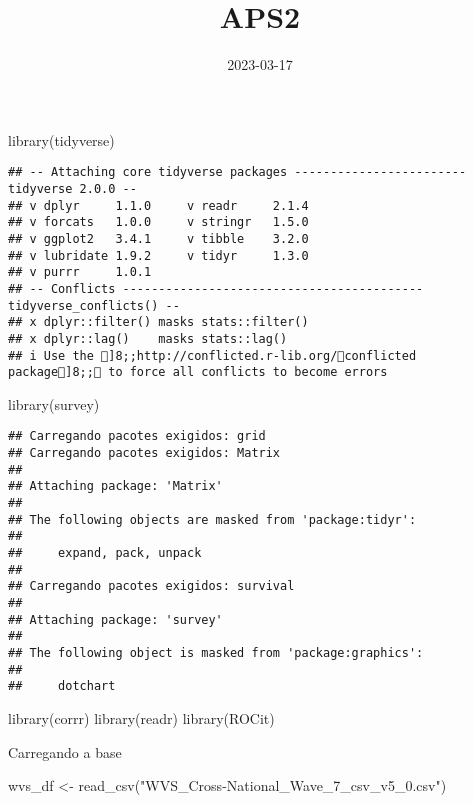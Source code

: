 \documentclass[
]{article}
\title{APS2}
\author{}
\date{\vspace{-2.5em}2023-03-17}
\newenvironment{Shaded}{\begin{snugshade}}{\end{snugshade}}
\newcommand{\FunctionTok}[1]{\textcolor[rgb]{0.00,0.00,0.00}{#1}}
\newcommand{\NormalTok}[1]{#1}
\newcommand{\OtherTok}[1]{\textcolor[rgb]{0.56,0.35,0.01}{#1}}
\newcommand{\StringTok}[1]{\textcolor[rgb]{0.31,0.60,0.02}{#1}}
\begin{document}
\maketitle

\begin{Shaded}
\begin{Highlighting}[]
\FunctionTok{library}\NormalTok{(tidyverse)}
\end{Highlighting}
\end{Shaded}

\begin{verbatim}
## -- Attaching core tidyverse packages ------------------------ tidyverse 2.0.0 --
## v dplyr     1.1.0     v readr     2.1.4
## v forcats   1.0.0     v stringr   1.5.0
## v ggplot2   3.4.1     v tibble    3.2.0
## v lubridate 1.9.2     v tidyr     1.3.0
## v purrr     1.0.1     
## -- Conflicts ------------------------------------------ tidyverse_conflicts() --
## x dplyr::filter() masks stats::filter()
## x dplyr::lag()    masks stats::lag()
## i Use the ]8;;http://conflicted.r-lib.org/conflicted package]8;; to force all conflicts to become errors
\end{verbatim}

\begin{Shaded}
\begin{Highlighting}[]
\FunctionTok{library}\NormalTok{(survey)}
\end{Highlighting}
\end{Shaded}

\begin{verbatim}
## Carregando pacotes exigidos: grid
## Carregando pacotes exigidos: Matrix
## 
## Attaching package: 'Matrix'
## 
## The following objects are masked from 'package:tidyr':
## 
##     expand, pack, unpack
## 
## Carregando pacotes exigidos: survival
## 
## Attaching package: 'survey'
## 
## The following object is masked from 'package:graphics':
## 
##     dotchart
\end{verbatim}

\begin{Shaded}
\begin{Highlighting}[]
\FunctionTok{library}\NormalTok{(corrr)}
\FunctionTok{library}\NormalTok{(readr)}
\FunctionTok{library}\NormalTok{(ROCit)}
\end{Highlighting}
\end{Shaded}

Carregando a base

\begin{Shaded}
\begin{Highlighting}[]
\NormalTok{wvs\_df }\OtherTok{\textless{}{-}} \FunctionTok{read\_csv}\NormalTok{(}\StringTok{"WVS\_Cross{-}National\_Wave\_7\_csv\_v5\_0.csv"}\NormalTok{)}
\end{Highlighting}
\end{Shaded}
\end{document}
